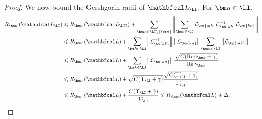 \documentclass{SciPost}
\renewcommand{\Re}{\operatorname{Re}}
\begin{document}
\begin{proof}
    We now bound the Gershgorin radii of \(\mathbfcal L_\LI\). For \(\bm n \in \LI\),
    \begin{equation}
        \begin{aligned}
            R_{\bm n} \left(\mathbfcal L_\LI\right) &\leqslant
            R_{\bm n} \left(\mathbfcal L_\LII\right) + \sum\limits_{\bm m \in \LI \setminus \{\bm n\}} \left \|
            \sum\limits_{\bm k \in \LJ}
            \mathcal L_{\bm{mk}}
            \mathcal L_{\bm{kk}}^{-1}
            \mathcal L_{\bm{kn}}
            \right \| \\
            &\leqslant
            R_{\bm n} \left(\mathbfcal L\right) +
            \sum\limits_{\bm k \in \LJ}
            \left \| \mathcal L_{\bm{kk}}^{-1} \right \|
            \left \| \mathcal L_{\bm{kn}} \right \|
            \sum\limits_{\bm m \in \LI} 
            \left \| \mathcal L_{\bm{mk}} \right \| \\
            &\leqslant
            R_{\bm n} \left(\mathbfcal L\right) + 
            \sum\limits_{\bm k \in \LJ}  
            \left \| \mathcal L_{\bm{k n}} \right\|
            \frac{\sqrt{C(\Re \gamma_{\bm k} + \gamma)}}{\Re \gamma_{\bm k}} \\
            &\leqslant
            R_{\bm n} \left(\mathbfcal L\right) + 
            \sqrt{C(\Upsilon_\LI + \gamma)}
            \frac{\sqrt{C(\Gamma'_\LI + \gamma)}}{\Gamma'_\LI} \\
            &\leqslant
            R_{\bm n} \left(\mathbfcal L\right) + 
            \frac{C(\Upsilon_\LI + \tilde\gamma)}{\Gamma'_\LI}
            \leqslant R_{\bm n}(\mathbfcal L) + \Delta.
        \end{aligned}
    \end{equation}


\end{proof}
\end{document}
